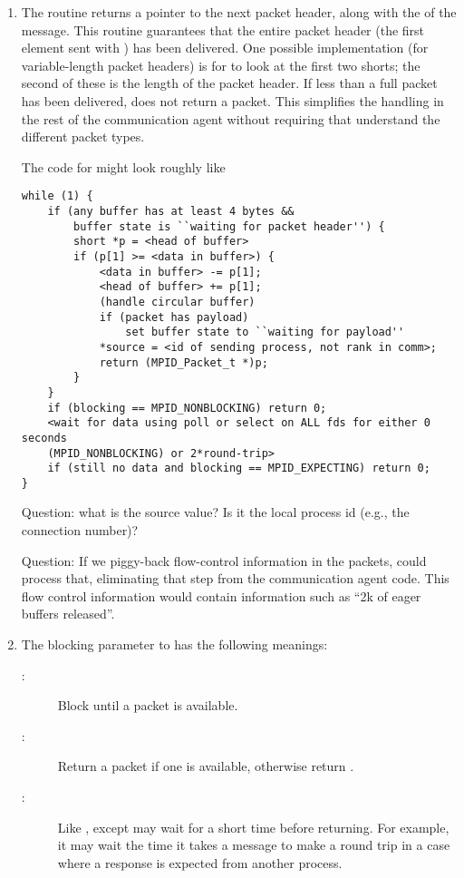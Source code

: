 \begin{enumerate}
\item The routine  returns a pointer to the next
  packet header, along with the  of the message.  This routine
  guarantees 
  that the entire packet header (the first  element sent with
  ) has been delivered.  
  One possible implementation (for variable-length packet headers) is for
   to look at the 
  first two shorts; the second of these is the length of the packet header.
  If less than a full packet has been delivered, 
  does not 
  return a packet.  This simplifies the handling in the rest of the
  communication agent without requiring that 
  understand the different packet types.

  The code for  might look roughly like
\begin{verbatim}
while (1) {
    if (any buffer has at least 4 bytes &&
        buffer state is ``waiting for packet header'') {
        short *p = <head of buffer>
        if (p[1] >= <data in buffer>) {
            <data in buffer> -= p[1];
            <head of buffer> += p[1];
            (handle circular buffer)
            if (packet has payload)
                set buffer state to ``waiting for payload''
            *source = <id of sending process, not rank in comm>;
            return (MPID_Packet_t *)p;
        }
    }
    if (blocking == MPID_NONBLOCKING) return 0;
    <wait for data using poll or select on ALL fds for either 0 seconds
    (MPID_NONBLOCKING) or 2*round-trip> 
    if (still no data and blocking == MPID_EXPECTING) return 0;
}
\end{verbatim}

  Question: what is the source value?  Is it the local process id (e.g., the
  connection number)?

  Question: If we piggy-back flow-control information in the packets,
   could process that, eliminating that step from the
  communication agent code.  This flow control information would contain
  information such as ``2k of eager buffers released''.

\item The blocking parameter to  has the following
  meanings:
  \begin{description}
  \item[:]Block until a packet is available.
  \item[:]Return a packet if one is available, otherwise
    return .
  \item[:]Like , except
     may wait for a short time before returning.  For
    example, it may wait the time it takes a message to make a round trip in a
    case where a response is expected from another process.
  \end{description}


\end{enumerate}
